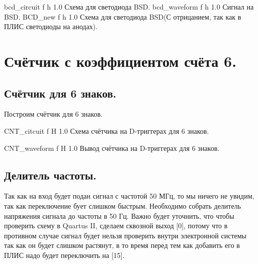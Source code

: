 \documentclass{bmstu}
\begin{document}
	{bcd_circuit}
	{f} %
	{h} %
	{1.0\textwidth} %
	{Схема для светодиода BSD.} %
	{bcd_waveform}
	{f} %
	{h} %
	{1.0\textwidth} %
	{Сигнал на BSD.} %
	{BCD_new}
	{f} %
	{h} %
	{1.0\textwidth} %
	{Схема для светодиода BSD(С отрицанием, так как в ПЛИС светодиоды на анодах).} %
	
	
	\chapter{Счётчик с коэффициентом счёта 6.}
	
	\section{Счётчик для 6 знаков.}
	\begin{flushleft}
		Построим счётчик для 6 знаков.
	\end{flushleft}

	{CNT_citcuit}
	{f} %
	{H} %
	{1.0\textwidth} %
	{Схема счётчика на D-триггерах для 6 знаков.} %

	{CNT_waveform}
	{f} %
	{H} %
	{1.0\textwidth} %
	{Вывод счётчика на D-триггерах для 6 знаков.} %

	\section{Делитель частоты.}

	\begin{flushleft}
		Так как на вход будет подан сигнал с частотой 50 МГц, то мы
		ничего не увидим, так как переключение бует слишком быстрым.
		Необходимо собрать делитель напряжения сигнала до частоты в
		50 Гц. Важно будет уточнить, что чтобы проверить схему в 
		Quartus II, сделаем сквозной выход [0], потому что в 
		противном случае сигнал будет нельзя проверить внутри 
		электронной системы так как он будет слишком растянут, в то 
		время перед тем как добавить его в ПЛИС надо будет переключить на [15].
	\end{flushleft}
\end{document}
